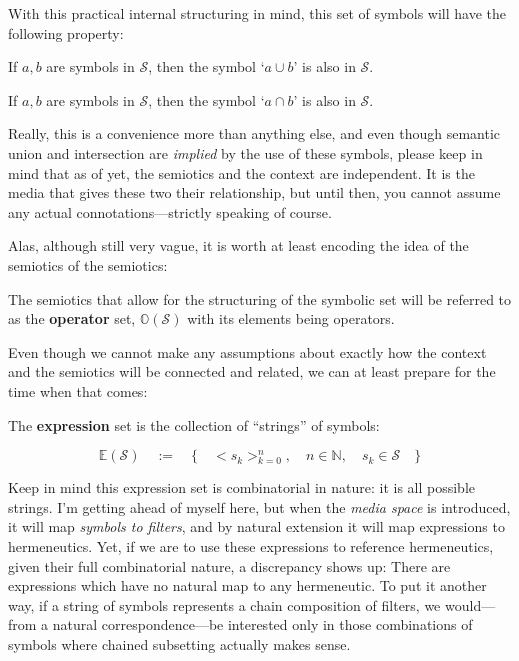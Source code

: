 \documentclass[twoside]{article}
\newenvironment{definition}[1][Definition]{\begin{trivlist}
\item[\hskip \labelsep {\bfseries #1:}]}{\end{trivlist}}
\begin{document}
With this practical internal structuring in mind, this set of symbols will have the following property:

\begin{definition}[Symbolic Union]

If $ a,b $ are symbols in $ \mathcal{S} $, then the symbol `$ a\cup b $' is also in $ \mathcal{S} $.

\end{definition}

\begin{definition}[Symbolic Intersection]

If $ a,b $ are symbols in $ \mathcal{S} $, then the symbol `$ a\cap b $' is also in $ \mathcal{S} $.

\end{definition}

Really, this is a convenience more than anything else, and even though semantic union and intersection
are \emph{implied} by the use of these symbols, please keep in mind that as of yet, the semiotics and the
context are independent. It is the media that gives these two their relationship, but until then, you cannot
assume any actual connotations---strictly speaking of course.

Alas, although still very vague, it is worth at least encoding the idea of the semiotics of the semiotics:

\begin{definition}[Semiotic Space - Semiotics]

The semiotics that allow for the structuring of the symbolic set will be referred to as the {\bfseries operator} set,
$ \mathbb{O}(\mathcal{S}) $ with its elements being operators.

\end{definition}

Even though we cannot make any assumptions about exactly how the context and the semiotics will be connected and related,
we can at least prepare for the time when that comes:

\begin{definition}[Semiotic Space - Media]

The {\bfseries expression} set is the collection of ``strings'' of symbols:

$$ \mathbb{E}(\mathcal{S})\quad:=\quad\{\quad <s_k\!>_{k=0}^n,\quad n\in\mathbb{N},\quad s_k\in\mathcal{S}\quad\} $$

\end{definition}

Keep in mind this expression set is combinatorial in nature: it is all possible strings. I'm getting ahead of myself here,
but when the \emph{media space} is introduced, it will map \emph{symbols to filters}, and by natural extension it will
map expressions to hermeneutics. Yet, if we are to use these expressions to reference hermeneutics, given their full
combinatorial nature, a discrepancy shows up: There are expressions which have no natural map to any hermeneutic.
To put it another way, if a string of symbols represents a chain composition of filters, we would---from a natural
correspondence---be interested only in those combinations of symbols where chained subsetting actually makes sense.
\end{document}
